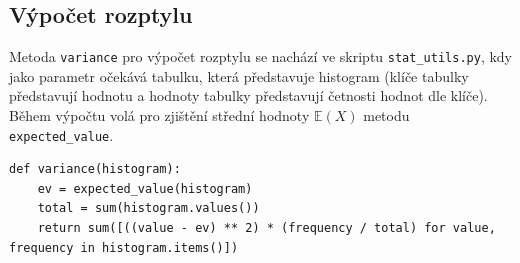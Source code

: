 \documentclass[12pt, a4paper]{article}
\begin{document}
    \subsection{Výpočet rozptylu}
    Metoda \texttt{variance} pro výpočet rozptylu se nachází ve skriptu \texttt{stat\_utils.py}, kdy jako parametr očekává tabulku,
    která představuje histogram (klíče tabulky představují hodnotu a hodnoty tabulky představují četnosti hodnot dle klíče).
    Během výpočtu volá pro zjištění střední hodnoty $\mathbb{E}(X)$ metodu \texttt{expected\_value}.

    \begin{lstlisting}
def variance(histogram):
    ev = expected_value(histogram)
    total = sum(histogram.values())
    return sum([((value - ev) ** 2) * (frequency / total) for value, frequency in histogram.items()])
    \end{lstlisting}

    
\end{document}
